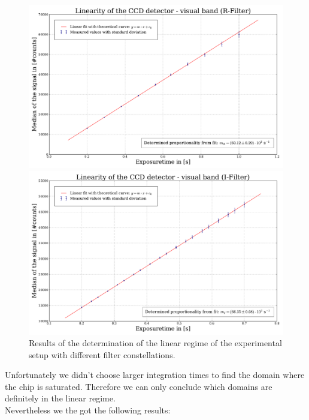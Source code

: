 \begin{figure}[H]
	\begin{minipage}{0.4\textwidth}
		\includegraphics[scale = 0.2]{figures/Plots/linearityR}
	\end{minipage}
	\begin{minipage}{0.4\textwidth}
	\hspace{1.7cm}
		\includegraphics[scale=0.2]{figures/Plots/linearityI}
	\end{minipage}
	\caption[Determination of the linear regime]{Results of the determination of the linear regime of the experimental setup with different filter constellations.}
\end{figure} 
Unfortunately we didn't choose larger integration times to find the domain where the chip is saturated. Therefore we can only conclude which domains are definitely in the linear regime.\\
Nevertheless we the got the following results:
